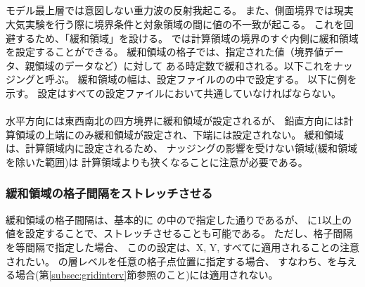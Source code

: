 \subsection{\SecBasicBufferSetting} \label{subsec:buffer}
モデル最上層では意図しない重力波の反射我起こる。
また、側面境界では現実大気実験を行う際に境界条件と対象領域の間に値の不一致が起こる。
これを回避するため、「緩和領域」を設ける。
\scalerm では計算領域の境界のすぐ内側に緩和領域を設定することができる。
緩和領域の格子では、指定された値（境界値データ、親領域のデータなど）に対して
ある時定数で緩和される。以下これをナッジングと呼ぶ。
緩和領域の幅は、設定ファイルのの中で設定する。
以下に例を示す。
設定はすべての設定ファイルにおいて共通していなければならない。\\

\\

水平方向には東西南北の四方境界に緩和領域が設定されるが、
鉛直方向には計算領域の上端にのみ緩和領域が設定され、下端には設定されない。
%
緩和領域は、計算領域内に設定されるため、
ナッジングの影響を受けない領域(緩和領域を除いた範囲)は
計算領域よりも狭くなることに注意が必要である。

\subsubsection{緩和領域の格子間隔をストレッチさせる}

緩和領域の格子間隔は、基本的に 
の中ので指定した通りであるが、
に1以上の値を設定することで、ストレッチさせることも可能である。
ただし、格子間隔を等間隔で指定した場合、
このの設定は、X, Y, {\ZDIR}すべてに適用されることの注意されたい。
{\ZDIR}の層レベルを任意の格子点位置に指定する場合、
すなわち、を与える場合(第\ref{subsec:gridinterv}節参照のこと)には適用されない。

